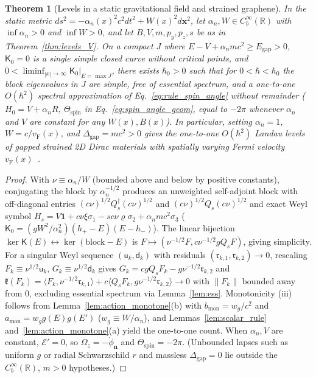 \documentclass[aps,prd,onecolumn,tightenlines,nofootinbib,notitlepage,10pt,floatfix]{revtex4-2}
\theoremstyle{indentedtheorem}
\newtheorem{theorem}{Theorem}
\begin{document}
\begin{theorem}[Levels in a static gravitational field and strained graphene]\label{thm:levels_grav}
In the static metric $ds^2=-\alpha_n(x)^2 c^2 dt^2+W(x)^2 d\mathbf{x}^2$, let $\alpha_n,W\in C_b^\infty(\mathbb{R})$ with $\inf\alpha_n>0$ and $\inf W>0$, and let $B,V,m,p_y,p_z,s$ be as in Theorem~\ref{thm:levels_V}. On a compact $J$ where $E-V+\alpha_n mc^2\ge E_\text{gap}>0$, $\mathsf{K}_0=0$ is a single simple closed curve without critical points, and $0<\liminf_{|x|\to\infty}\mathsf{K}_0|_{E=\max J}$, there exists $\hbar_0>0$ such that for $0<\hbar<\hbar_0$ the block eigenvalues in $J$ are simple, free of essential spectrum, and a one-to-one $O(\hbar^2)$ spectral approximation of Eq.~\eqref{eq:rule_spin_angle} without remainder ($H_0=V+\alpha_n R$, $\Theta_\text{spin}$ in Eq.~\eqref{eq:spin_angle_geom}, equal to $-2\pi$ whenever $\alpha_n$ and $V$ are constant for any $W(x),B(x)$). In particular, setting $\alpha_n=1$, $W=c/v_\text{F}(x)$, and $\Delta_\text{gap}=mc^2>0$ gives the one-to-one $O(\hbar^2)$ Landau levels of gapped strained 2D Dirac materials with spatially varying Fermi velocity $v_\text{F}(x)$~\citep{deJuanSturlaVozmediano2012Space}.
\end{theorem}
\begin{proof}
With $\nu\equiv\alpha_n/W$ (bounded above and below by positive constants), conjugating the block by $\alpha_n^{-1/2}$ produces an unweighted self-adjoint block with off-diagonal entries $(c\nu)^{1/2}Q_s^{\dagger}(c\nu)^{1/2}$ and $(c\nu)^{1/2}Q_s(c\nu)^{1/2}$ and exact Weyl symbol $H_s=V\mathbf{1}+c\nu\xi\sigma_1-sc\nu\varrho\sigma_2+\alpha_n mc^2\sigma_3$ ($\mathsf{K}_0=(gW^2/\alpha_n^2)(h_+-E)(E-h_-)$). The linear bijection $\ker\mathsf{K}(E)\leftrightarrow\ker(\text{block}-E)$ is $F\mapsto(\nu^{-1/2}F,c\nu^{-1/2}gQ_s F)$, giving simplicity. For a singular Weyl sequence $(\mathsf{u}_k,\mathsf{d}_k)$ with residuals $(\mathfrak{r}_{k,1},\mathfrak{r}_{k,2})\to 0$, rescaling $F_k\equiv\nu^{1/2}\mathsf{u}_k$, $G_k\equiv\nu^{1/2}\mathsf{d}_k$ gives $G_k=cgQ_s F_k-g\nu^{-1/2}\mathfrak{r}_{k,2}$ and $\mathfrak{k}(F_k)=\langle F_k,\nu^{-1/2}\mathfrak{r}_{k,1}\rangle+c\langle Q_s F_k,g\nu^{-1/2}\mathfrak{r}_{k,2}\rangle\to 0$ with $\|F_k\|$ bounded away from $0$, excluding essential spectrum via Lemma~\ref{lem:ess}. Monotonicity (iii) follows from Lemma~\ref{lem:action_monotone}(b) with $b_\text{mon}=w_g/c^2$ and $a_\text{mon}=w_g g(E)g(E')$ ($w_g\equiv W/\alpha_n$), and Lemmas~\ref{lem:scalar_rule} and~\ref{lem:action_monotone}(a) yield the one-to-one count. When $\alpha_n,V$ are constant, $\mathcal{E}'=0$, so $\Omega_z=-\dot{\phi}_\mathbf{n}$ and $\Theta_\text{spin}=-2\pi$. (Unbounded lapses such as uniform $g$ or radial Schwarzschild $r$ and massless $\Delta_\text{gap}=0$ lie outside the $C_b^\infty(\mathbb{R})$, $m>0$ hypotheses.)
\end{proof}
\end{document}
